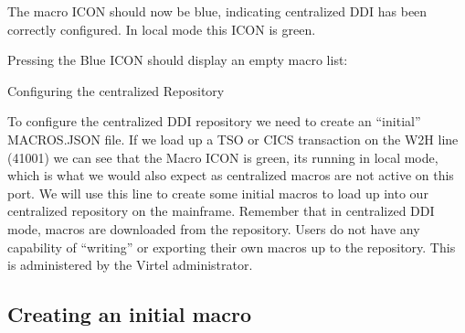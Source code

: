 \documentclass[letterpaper,10pt,english]{sphinxmanual}
\begin{document}
The macro ICON should now be blue, indicating centralized DDI has been correctly configured. In local mode this ICON is green.



Pressing the Blue ICON should display an empty macro list:



\ignorespaces 
Configuring the centralized Repository

To configure the centralized DDI repository we need to create an “initial” MACROS.JSON file. If we load up a TSO or CICS transaction on the W2H line (41001) we can see that the Macro ICON is green, its running in local mode, which is what we would also expect as centralized macros are not active on this port. We will use this line to create some initial macros to load up into our centralized repository on the mainframe. Remember that in centralized DDI mode, macros are downloaded from the repository. Users do not have any capability of “writing” or exporting their own macros up to the repository. This is administered by the Virtel administrator.

\begin{sphinxVerbatim}[commandchars=\\\{\}]
\end{sphinxVerbatim}



\ignorespaces 

\subsection{Creating an initial macro}
\label{\detokenize{Customization:creating-an-initial-macro}}\label{\detokenize{Customization:index-86}}
\end{document}
